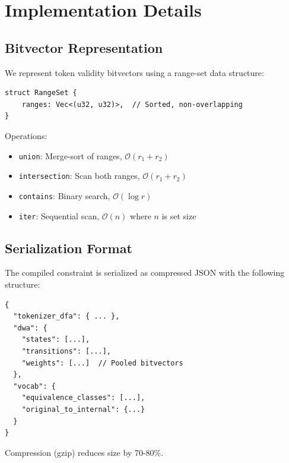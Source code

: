 \documentclass[11pt,a4paper]{article}
\newcommand{\bigO}{\mathcal{O}}
\theoremstyle{plain}
\theoremstyle{definition}
\theoremstyle{remark}
\begin{document}
\section{Implementation Details}
\label{app:implementation}

\subsection{Bitvector Representation}

We represent token validity bitvectors using a range-set data structure:

\begin{verbatim}
struct RangeSet {
    ranges: Vec<(u32, u32)>,  // Sorted, non-overlapping
}
\end{verbatim}

Operations:
\begin{itemize}
\item \texttt{union}: Merge-sort of ranges, $\bigO(r_1 + r_2)$
\item \texttt{intersection}: Scan both ranges, $\bigO(r_1 + r_2)$
\item \texttt{contains}: Binary search, $\bigO(\log r)$
\item \texttt{iter}: Sequential scan, $\bigO(n)$ where $n$ is set size
\end{itemize}

\subsection{Serialization Format}

The compiled constraint is serialized as compressed JSON with the following structure:

\begin{verbatim}
{
  "tokenizer_dfa": { ... },
  "dwa": {
    "states": [...],
    "transitions": [...],
    "weights": [...]  // Pooled bitvectors
  },
  "vocab": {
    "equivalence_classes": [...],
    "original_to_internal": {...}
  }
}
\end{verbatim}

Compression (gzip) reduces size by 70-80\%.
\end{document}
